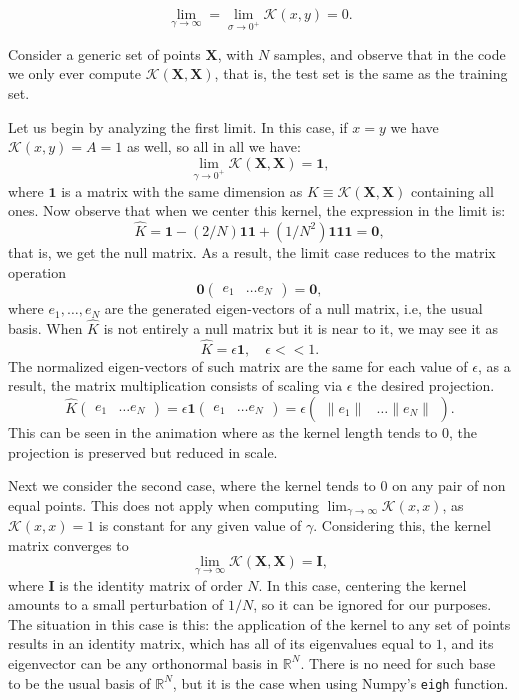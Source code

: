 \documentclass[11pt]{article}
\begin{document}
\[
     \lim_{\gamma \to \infty} = \lim_{\sigma \to 0^{+}} \mathcal{K}(x,y) = 0.
\]

Consider a generic set of points $\bm{X}$, with $N$ samples, and observe that in the code we only ever compute $\mathcal K(\bm X, \bm X)$, that is, the test set is the same as the training set.

Let us begin by analyzing the first limit. In this case, if $x=y$ we have $\mathcal K(x,y)=A=1$ as well, so all in all we have:
\[
\lim_{\gamma\to0^+} \mathcal K(\bm X, \bm X) = \bm 1,
\]
where $\bm 1$ is a matrix with the same dimension as $K\equiv \mathcal K(\bm X, \bm X)$ containing all ones. Now observe that when we center this kernel, the expression in the limit is:
\[
\hat K = \bm 1 - (2/N)\bm 1 \bm 1 + (1/N^2)\bm 1 \bm 1 \bm 1 = \bm 0,
\]
that is, we get the null matrix. As a result, the limit case reduces to the matrix operation
\[
  \bm 0 \begin{pmatrix}e_{1} & \dots e_{N} \end{pmatrix} = \bm 0,
\]
where \( e_{1}, \dots, e_{N} \) are the generated eigen-vectors of a null matrix, i.e, the usual basis. When \( \hat K \) is not entirely a null matrix but it is near to it, we may see it as
\[
  \hat K = \epsilon \bm 1, \quad \epsilon << 1.
\]
 The normalized eigen-vectors of such matrix are the same for each value of \( \epsilon \), as a result, the matrix multiplication consists of scaling via \( \epsilon \) the desired projection.
\[
  \hat K \begin{pmatrix}e_{1} & \dots e_{N} \end{pmatrix} = \epsilon \bm 1 \begin{pmatrix}e_{1} & \dots e_{N} \end{pmatrix} = \epsilon \begin{pmatrix}\|e_{1}\| & \dots \|e_{N}\| \end{pmatrix}.
\]
This can be seen in the animation where as the kernel length tends to \( 0 \), the projection is preserved but reduced in scale.


Next we consider the second case, where the kernel tends to \( 0 \) on any pair of non equal points. This does not apply when computing \( \lim_{\gamma \to \infty} \mathcal{K}(x,x) \), as \( \mathcal{K}(x,x) = 1 \) is constant for any given value of \( \gamma \). Considering this, the kernel matrix converges to
\[
      \lim_{\gamma \to \infty} \mathcal{K}(\bm{X}, \bm{X}) = \bm{I},
\]
where $\bm{I}$ is the identity matrix of order $N$. In this case, centering the kernel amounts to a small perturbation of $1/N$, so it can be ignored for our purposes. The situation in this case is this: the application of the kernel to any set of points results in an identity matrix, which has all of its eigenvalues equal to \( 1 \), and its eigenvector can be any orthonormal basis in \( \mathbb{R}^N \). There is no need for such base to be the usual basis of \( \mathbb{R}^N \), but it is the case when using Numpy's \texttt{eigh} function.
\end{document}
